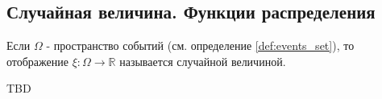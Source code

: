 \subsection{Случайная величина. Функции распределения}

\begin{definition}
\label{def:random_variable}
Если $\Omega$ - пространство событий (см. определение \autoref{def:events_set}), то 
отображение $\xi: \Omega \to \mathbb{R}$ называется случайной
величиной. 
\end{definition}

TBD
